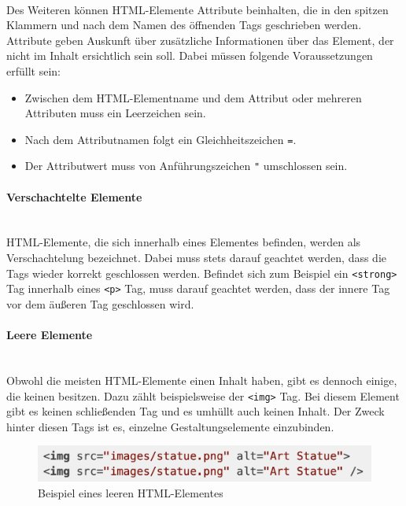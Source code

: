 \mbox{}\\
Des Weiteren können HTML-Elemente Attribute beinhalten, die in den spitzen Klammern und nach dem Namen des öffnenden Tags geschrieben werden. Attribute geben Auskunft über zusätzliche Informationen über das Element, der nicht im Inhalt ersichtlich sein soll. Dabei müssen folgende Voraussetzungen erfüllt sein:

\begin{itemize}
	\item Zwischen dem HTML-Elementname und dem Attribut oder mehreren Attributen muss ein Leerzeichen sein.
	\item Nach dem Attributnamen folgt ein Gleichheitszeichen \texttt{=}.
	\item Der Attributwert muss von Anführungszeichen \texttt{"} umschlossen sein.
\end{itemize}

\paragraph{Verschachtelte Elemente}
\mbox{}\\
HTML-Elemente, die sich innerhalb eines Elementes befinden, werden als Verschachtelung bezeichnet. Dabei muss stets darauf geachtet werden, dass die Tags wieder korrekt geschlossen werden. Befindet sich zum Beispiel ein \texttt{<strong>} Tag innerhalb eines \texttt{<p>} Tag, muss darauf geachtet werden, dass der innere Tag vor dem äußeren Tag geschlossen wird. 

\paragraph{Leere Elemente}
\mbox{}\\
Obwohl die meisten HTML-Elemente einen Inhalt haben, gibt es dennoch einige, die keinen besitzen. Dazu zählt beispielsweise der \texttt{<img>} Tag. Bei diesem Element gibt es keinen schließenden Tag und es umhüllt auch keinen Inhalt. Der Zweck hinter
diesen Tags ist es, einzelne Gestaltungselemente einzubinden.

\begin{figure}[H]
	\begin{center}
		\includegraphics[scale=.5]{images/empty-element-example.png}
	\end{center}
		\caption{Beispiel eines leeren HTML-Elementes}
\end{figure}

